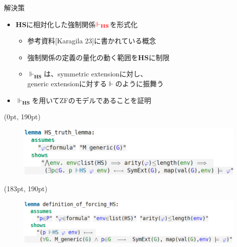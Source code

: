 \documentclass[17pt]{beamer}
\begin{document}
\begin{frame}{解決策}
    \vspace{-50pt}
    {\small
        \begin{itemize}[itemsep=8pt]
            \item $\bm{\mathbf{HS}}$に相対化した強制関係$\textcolor{red}{\Vdash_{\bm{\mathbf{HS}}}}$を形式化
                  \begin{itemize}[left=0cm]
                      \item 参考資料[Karagila 23]に書かれている概念
                      \item 強制関係の定義の量化の動く範囲を$\bm{\mathbf{HS}}$に制限
                      \item $\Vdash_{\bm{\mathbf{HS}}}$は、symmetric extensionに対し、\\
                            generic extensionに対する$\Vdash$のように振舞う
                  \end{itemize}
            \item $\Vdash_{\bm{\mathbf{HS}}}$を用いてZFのモデルであることを証明
        \end{itemize}
    }
    \begin{textblock*}{0.58\linewidth}(0pt, 190pt)
        \begin{figure}
            \includegraphics[width=\linewidth]{./images/HS_truth_lemma.png}
        \end{figure}
    \end{textblock*}
    \begin{textblock*}{0.58\linewidth}(183pt, 190pt)
        \begin{figure}
            \includegraphics[width=\linewidth]{./images/HS_forces_def.png}
        \end{figure}
    \end{textblock*}
\end{frame}
\end{document}
